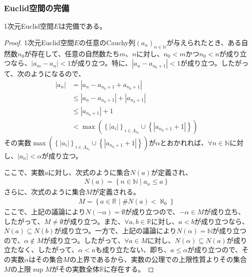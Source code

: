 \documentclass[dvipdfmx]{jsarticle}
\begin{document}
\subsubsection{Euclid空間の完備}%
\begin{thm}\label{8.2.5.9} 1次元Euclid空間$E$は完備である。
\end{thm}
\begin{proof}
1次元Euclid空間$E$の任意のCauchy列$\left( a_{n} \right)_{n \in \mathbb{N}}$が与えられたとき、ある自然数$n_{0}$が存在して、任意の自然数たち$m$、$n$に対し、$n_{0} < m$かつ$n_{0} < n$が成り立つなら、$\left| a_{m} - a_{n} \right| < 1$が成り立つ。特に、$\left| a_{n} - a_{n_{0} + 1} \right| < 1$が成り立つ。したがって、次のようになるので、
\begin{align*}
\left| a_{n} \right| &= \left| a_{n} - a_{n_{0} + 1} + a_{n_{0} + 1} \right|\\
&\leq \left| a_{n} - a_{n_{0} + 1} \right| + \left| a_{n_{0} + 1} \right|\\
&\leq \left| a_{n_{0} + 1} \right| + 1\\
&< \max\left( \left\{ \left| a_{i} \right| \right\}_{i \in \varLambda_{n_{0}}} \cup \left\{ \left| a_{n_{0} + 1} + 1 \right| \right\} \right)
\end{align*}
その実数$\max\left( \left\{ \left| a_{i} \right| \right\}_{i \in \varLambda_{n_{0}}} \cup \left\{ \left| a_{n_{0} + 1} + 1 \right| \right\} \right)$が$\alpha$とおかれれば、$\forall n \in \mathbb{N}$に対し、$\left| a_{n} \right| < \alpha$が成り立つ。\par
ここで、実数$a$に対し、次式のように集合$N(a)$が定義され、
\begin{align*}
N(a) = \left\{ n \in \mathbb{N} \middle| a_{n} \leq a \right\}
\end{align*}
さらに、次式のように集合$M$が定義される。
\begin{align*}
M = \left\{ a \in \mathbb{R} \middle| {\#}{N(a)} < \aleph_{0} \right\}
\end{align*}
ここで、上記の議論により$N( - \alpha) = \emptyset$が成り立つので、$- \alpha \in M$が成り立ち、したがって、$M \neq \emptyset$が成り立つ。また、$\forall a,b \in \mathbb{R}$に対し、$a < b$が成り立つなら、$N(a) \subseteq N(b)$が成り立つ。一方で、上記の議論により$N(\alpha) = \mathbb{N}$が成り立つので、$\alpha \notin M$が成り立つ。したがって、$\forall a \in M$に対し、$N(\alpha) \subseteq N(a)$が成り立たなく、したがって、$\alpha < a$も成り立たない、即ち、$a \leq \alpha$が成り立つので、その実数$\alpha$はその集合$M$の上界であるから、実数の公理での上限性質よりその集合$M$の上限$\sup M$がその実数全体$\mathbb{R}$に存在する。\par

\end{proof}
\end{document}
